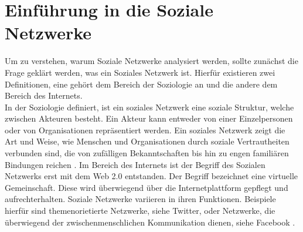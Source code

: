 \chapter{Einführung in die Soziale Netzwerke}\label{ch:SNA}
Um zu verstehen, warum Soziale Netzwerke analysiert werden, sollte zunächst die Frage geklärt werden, was ein Soziales Netzwerk ist. Hierfür existieren zwei Definitionen, eine gehört dem Bereich der Soziologie an und die andere dem Bereich des Internets. \\
In der Soziologie definiert, ist ein soziales Netzwerk eine soziale Struktur, welche zwischen Akteuren besteht. Ein Akteur kann entweder von einer Einzelpersonen oder  von Organisationen repräsentiert werden. Ein soziales Netzwerk zeigt die Art und Weise, wie Menschen und Organisationen durch soziale Vertrautheiten verbunden sind, die von zufälligen Bekanntschaften bis hin zu engen familiären Bindungen reichen \cite{SNADefinition}. Im Bereich des Internets ist der Begriff des Sozialen Netzwerks erst mit dem Web 2.0 entstanden. Der Begriff bezeichnet eine virtuelle Gemeinschaft. Diese wird überwiegend über die Internetplattform gepflegt und aufrechterhalten. Soziale Netzwerke variieren in ihren Funktionen. Beispiele hierfür sind themenorietierte Netzwerke, siehe Twitter, oder Netzwerke, die überwiegend der zwischenmenschlichen Kommunikation dienen, siehe Facebook \cite{SNAWeb2.0}.

